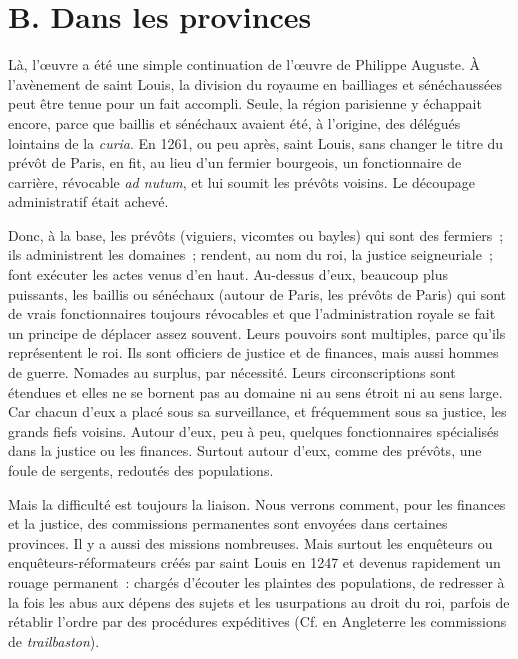\documentclass[french,twoside]{book} %
\begin{document}
\section[{B. Dans les provinces}]{B. Dans les provinces}
\label{c04b}
\noindent Là, l’œuvre a été une simple continuation de l’œuvre de Philippe Auguste. À l’avènement de saint Louis, la division du royaume en bailliages et sénéchaussées peut être tenue pour un fait accompli. Seule, la région parisienne y échappait encore, parce que baillis et sénéchaux avaient été, à l’origine, des délégués lointains de la {\itshape curia}. En 1261, ou peu après, saint Louis, sans changer le titre du prévôt de Paris, en fit, au lieu d’un fermier bourgeois, un fonctionnaire de carrière, révocable {\itshape ad nutum}, et lui soumit les prévôts voisins. Le découpage administratif était achevé.\par
Donc, à la base, les prévôts (viguiers, vicomtes ou bayles) qui sont des fermiers ; ils administrent les domaines ; rendent, au nom du roi, la justice seigneuriale ; font exécuter les actes venus d’en  
\label{p40} haut. Au-dessus d’eux, beaucoup plus puissants, les baillis ou sénéchaux (autour de Paris, les prévôts de Paris) qui sont de vrais fonctionnaires toujours révocables et que l’administration royale se fait un principe de déplacer assez souvent. Leurs pouvoirs sont multiples, parce qu’ils représentent le roi. Ils sont officiers de justice et de finances, mais aussi hommes de guerre. Nomades au surplus, par nécessité. Leurs circonscriptions sont étendues et elles ne se bornent pas au domaine ni au sens étroit ni au sens large. Car chacun d’eux a placé sous sa surveillance, et fréquemment sous sa justice, les grands fiefs voisins. Autour d’eux, peu à peu, quelques fonctionnaires spécialisés dans la justice ou les finances. Surtout autour d’eux, comme des prévôts, une foule de sergents, redoutés des populations.\par
Mais la difficulté est toujours la liaison. Nous verrons comment, pour les finances et la justice, des commissions permanentes sont envoyées dans certaines provinces. Il y a aussi des missions nombreuses. Mais surtout les enquêteurs ou enquêteurs-réformateurs créés par saint Louis en 1247 et devenus rapidement un rouage permanent : chargés d’écouter les plaintes des populations, de redresser à la fois les abus aux dépens des sujets et les usurpations au droit du roi, parfois de rétablir l’ordre par des procédures expéditives (Cf. en Angleterre les commissions de \emph{trailbaston}).
\end{document}
